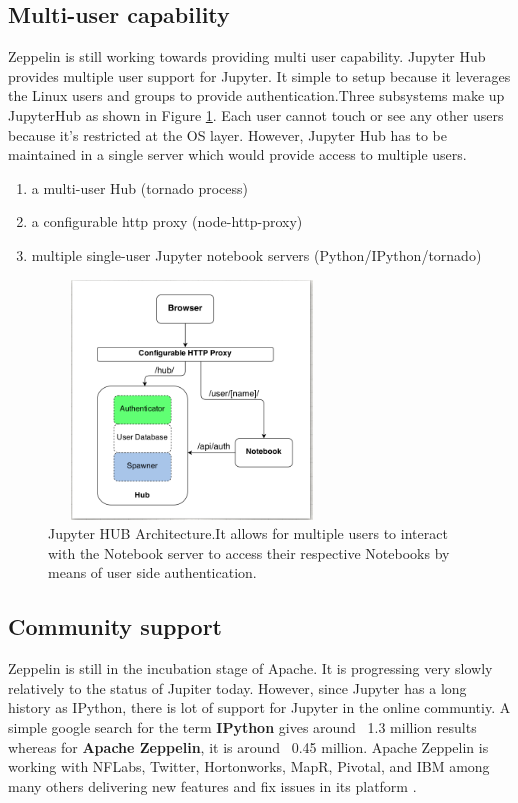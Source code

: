 \documentclass[9pt,twocolumn,twoside]{../../styles/osajnl}
\begin{document}
\subsection{Multi-user capability}
Zeppelin is still working towards providing multi user capability. Jupyter Hub \cite{www-jupyterhub} provides multiple user support for Jupyter. It simple to setup because it leverages the Linux users and groups to provide authentication.Three subsystems make up JupyterHub as shown in Figure \ref{fig:jhub}.
Each user cannot touch or see any other users because it's restricted at the OS layer. However, Jupyter Hub has to be maintained in a single server which would provide access to multiple users.
\begin{enumerate}
     \item a multi-user Hub (tornado process)
     \item a configurable http proxy (node-http-proxy)
     \item multiple single-user Jupyter notebook servers (Python/IPython/tornado) 
\end{enumerate}
\begin{figure}[h]
\begin{center}
\includegraphics[width =3in,height=2.5in]{images/jhub}
\caption{Jupyter HUB Architecture.It allows for multiple users to interact with the Notebook server to access their respective Notebooks by means of user side authentication.\cite{www-jupyterhub}}
\label{fig:jhub}
\end{center}
\end{figure}

\subsection{Community support}

Zeppelin is still in the incubation stage of Apache. It is progressing very slowly relatively to the status of Jupiter today. However, since Jupyter has a long history as IPython, there is lot of support for Jupyter in the online communtiy. A simple google search for the term \textbf{IPython} gives around ~1.3 million results whereas for \textbf{Apache Zeppelin}, it is around ~0.45 million. Apache Zeppelin is working with NFLabs, Twitter, Hortonworks, MapR, Pivotal, and IBM among many others delivering new features and fix issues in its platform \cite{www-horton-zeppelin}.
\end{document}
